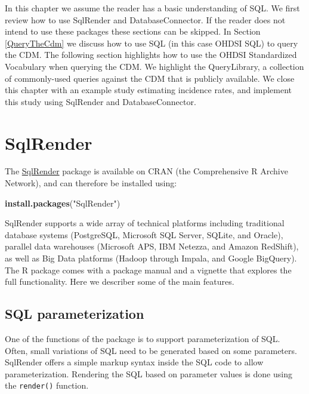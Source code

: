 \documentclass[11pt]{book}
\newenvironment{Shaded}{\begin{snugshade}}{\end{snugshade}}
\newcommand{\KeywordTok}[1]{\textcolor[rgb]{0.13,0.29,0.53}{\textbf{#1}}}
\newcommand{\NormalTok}[1]{#1}
\newcommand{\StringTok}[1]{\textcolor[rgb]{0.31,0.60,0.02}{#1}}
\theoremstyle{definition}
\theoremstyle{definition}
\theoremstyle{definition}
\theoremstyle{remark}
\begin{document}
In this chapter we assume the reader has a basic understanding of SQL. We first review how to use SqlRender and DatabaseConnector. If the reader does not intend to use these packages these sections can be skipped. In Section \ref{QueryTheCdm} we discuss how to use SQL (in this case OHDSI SQL) to query the CDM. The following section highlights how to use the OHDSI Standardized Vocabulary when querying the CDM. We highlight the QueryLibrary, a collection of commonly-used queries against the CDM that is publicly available. We close this chapter with an example study estimating incidence rates, and implement this study using SqlRender and DatabaseConnector.  

\hypertarget{SqlRender}{%
\section{SqlRender}\label{SqlRender}}

The \href{https://ohdsi.github.io/SqlRender/}{SqlRender} package is available on CRAN (the Comprehensive R Archive Network), and can therefore be installed using:

\begin{Shaded}
\begin{Highlighting}[]
\KeywordTok{install.packages}\NormalTok{(}\StringTok{"SqlRender"}\NormalTok{)}
\end{Highlighting}
\end{Shaded}

SqlRender supports a wide array of technical platforms including traditional database systems (PostgreSQL, Microsoft SQL Server, SQLite, and Oracle), parallel data warehouses (Microsoft APS, IBM Netezza, and Amazon RedShift), as well as Big Data platforms (Hadoop through Impala, and Google BigQuery). The R package comes with a package manual and a vignette that explores the full functionality. Here we describer some of the main features.

\hypertarget{sql-parameterization}{%
\subsection{SQL parameterization}\label{sql-parameterization}}

One of the functions of the package is to support parameterization of SQL. Often, small variations of SQL need to be generated based on some parameters. SqlRender offers a simple markup syntax inside the SQL code to allow parameterization. Rendering the SQL based on parameter values is done using the \texttt{render()} function. 
\end{document}
